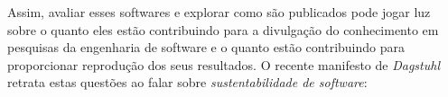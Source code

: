 %
%
%
%
%
%
%
%
%
%
%
%
%
%
%
%

Assim, avaliar esses softwares e explorar como são publicados pode jogar luz
sobre o quanto eles estão contribuindo para a divulgação do conhecimento em
pesquisas da engenharia de software e o quanto estão contribuindo para
proporcionar reprodução dos seus resultados. O recente manifesto de {\it
Dagstuhl} \cite{allen2017engineering} retrata estas questões ao falar sobre
{\it sustentabilidade de software}:

